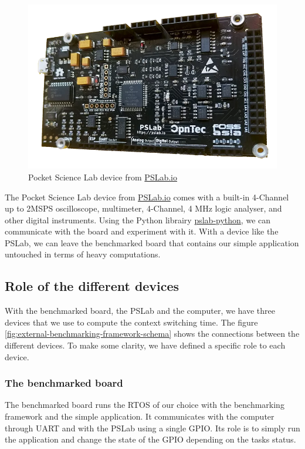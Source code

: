 \begin{figure}[!ht]
  \centering
  \includegraphics[scale=0.25]{assets/pslab.png}
  \caption{\label{fig:pslab}Pocket Science Lab device from \href{https://pslab.io}{PSLab.io}}
\end{figure}

The Pocket Science Lab device from \href{https://pslab.io}{PSLab.io} comes 
  with a built-in 4-Channel up to 2MSPS oscilloscope, multimeter, 4-Channel, 4 MHz logic analyser, and other digital instruments.
Using the Python librairy \href{https://github.com/fossasia/pslab-python}{pslab-python}, we can communicate with the board and experiment with it.
With a device like the PSLab, we can leave the benchmarked board that contains our simple application untouched in terms of heavy computations.

\subsection{Role of the different devices}

With the benchmarked board, the PSLab and the computer, we have three devices that we use to compute the context switching time.
The figure \ref{fig:external-benchmarking-framework-schema} shows the connections between the different devices.
To make some clarity, we have defined a specific role to each device.

\subsubsection{The benchmarked board}
The benchmarked board runs the RTOS of our choice with the benchmarking framework and the simple application.
It communicates with the computer through UART and with the PSLab using a single GPIO.
Its role is to simply run the application and change the state of the GPIO depending on the tasks status.

